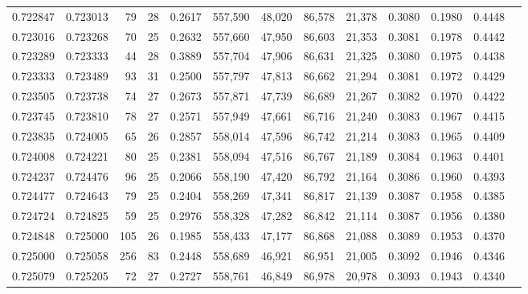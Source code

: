 \begin{tabular}{rrrrrrrrrrrrr}
0.722847 & 0.723013 &     79 &    28 &                                     0.2617 & 557,590 &  48,020 &  86,578 &  21,378 & 0.3080 & 0.1980 & 0.4448 \\
0.723016 & 0.723268 &     70 &    25 &                                     0.2632 & 557,660 &  47,950 &  86,603 &  21,353 & 0.3081 & 0.1978 & 0.4442 \\
0.723289 & 0.723333 &     44 &    28 &                                     0.3889 & 557,704 &  47,906 &  86,631 &  21,325 & 0.3080 & 0.1975 & 0.4438 \\
0.723333 & 0.723489 &     93 &    31 &                                     0.2500 & 557,797 &  47,813 &  86,662 &  21,294 & 0.3081 & 0.1972 & 0.4429 \\
0.723505 & 0.723738 &     74 &    27 &                                     0.2673 & 557,871 &  47,739 &  86,689 &  21,267 & 0.3082 & 0.1970 & 0.4422 \\
0.723745 & 0.723810 &     78 &    27 &                                     0.2571 & 557,949 &  47,661 &  86,716 &  21,240 & 0.3083 & 0.1967 & 0.4415 \\
0.723835 & 0.724005 &     65 &    26 &                                     0.2857 & 558,014 &  47,596 &  86,742 &  21,214 & 0.3083 & 0.1965 & 0.4409 \\
0.724008 & 0.724221 &     80 &    25 &                                     0.2381 & 558,094 &  47,516 &  86,767 &  21,189 & 0.3084 & 0.1963 & 0.4401 \\
0.724237 & 0.724476 &     96 &    25 &                                     0.2066 & 558,190 &  47,420 &  86,792 &  21,164 & 0.3086 & 0.1960 & 0.4393 \\
0.724477 & 0.724643 &     79 &    25 &                                     0.2404 & 558,269 &  47,341 &  86,817 &  21,139 & 0.3087 & 0.1958 & 0.4385 \\
0.724724 & 0.724825 &     59 &    25 &                                     0.2976 & 558,328 &  47,282 &  86,842 &  21,114 & 0.3087 & 0.1956 & 0.4380 \\
0.724848 & 0.725000 &    105 &    26 &                                     0.1985 & 558,433 &  47,177 &  86,868 &  21,088 & 0.3089 & 0.1953 & 0.4370 \\
0.725000 & 0.725058 &    256 &    83 &                                     0.2448 & 558,689 &  46,921 &  86,951 &  21,005 & 0.3092 & 0.1946 & 0.4346 \\
0.725079 & 0.725205 &     72 &    27 &                                     0.2727 & 558,761 &  46,849 &  86,978 &  20,978 & 0.3093 & 0.1943 & 0.4340 \\

\end{tabular}
